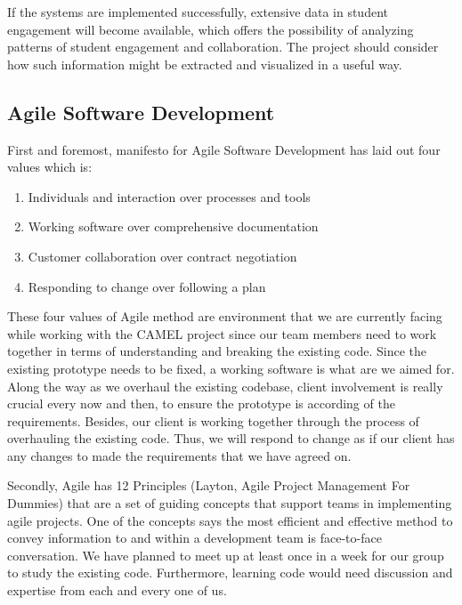 \documentclass[a4paper, 12pt, titlepage]{article}
\begin{document}
	If the systems are implemented successfully, extensive data in student engagement will become available, which offers the possibility of analyzing patterns of student engagement and collaboration. The project should consider how such information might be extracted and visualized in a useful way. 

\subsection*{Agile Software Development}
First and foremost, manifesto for Agile Software Development has laid out four values which is:

\begin{enumerate}[label=(\roman*)]
\item Individuals and interaction over processes and tools
\item Working software over comprehensive documentation
\item Customer collaboration over contract negotiation
\item Responding to change over following a plan 
\end{enumerate}

These four values of Agile method are environment that we are currently facing while working with the CAMEL project since our team members need to work together in terms of understanding and breaking the existing code. Since the existing prototype needs to be fixed, a working software is what are we aimed for. Along the way as we overhaul the existing codebase, client involvement is really crucial every now and then, to ensure the prototype is according of the requirements. Besides, our client is working together through the process of overhauling the existing code. Thus, we will respond to change as if our client has any changes to made the requirements that we have agreed on.  

	Secondly, Agile has 12 Principles (Layton, Agile Project Management For Dummies) that are a set of guiding concepts that support teams in implementing agile projects. One of the concepts says the most efficient and effective method to convey information to and within a development team is face-to-face conversation. We have planned to meet up at least once in a week for our group to study the existing code. Furthermore, learning code would need discussion and expertise from each and every one of us. 

\end{document}
